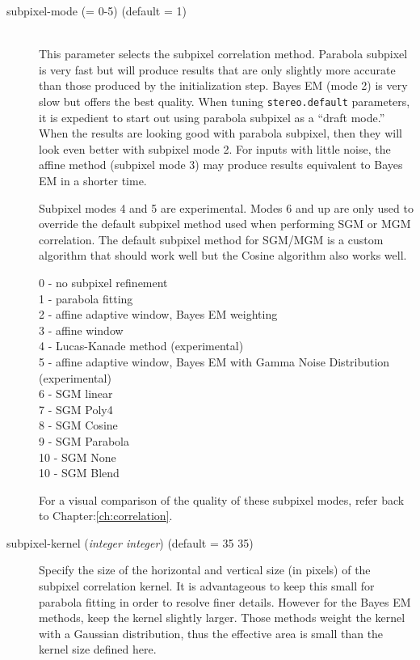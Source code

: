 \begin{description}

\item[subpixel-mode \textnormal{\small{(= 0-5)}} (default = 1)] \hfill \\
  This parameter selects the subpixel correlation method. Parabola subpixel
  is very fast but will produce results that are only slightly more accurate
   than those produced by the initialization step. Bayes EM (mode 2)
  is very slow but offers the best quality. When tuning {\tt stereo.default}
  parameters, it is expedient to start out using parabola subpixel as a
  ``draft mode.'' When the results are looking good with parabola subpixel,
  then they  will look even better with subpixel mode 2.  For inputs with
  little noise, the affine method (subpixel mode 3) may produce results
  equivalent to Bayes EM in a shorter time.
  
  Subpixel modes 4 and 5 are experimental.  Modes 6 and up are only used to
  override the default subpixel method used when performing SGM or MGM 
  correlation.  The default subpixel method for SGM/MGM is a custom 
  algorithm that should work well but the Cosine algorithm also works well.

  \begin{description}
    \item[0 - no subpixel refinement]
    \item[1 - parabola fitting ]
    \item[2 - affine adaptive window, Bayes EM weighting ]
    \item[3 - affine window ]
    \item[4 - Lucas-Kanade method (experimental)]
    \item[5 - affine adaptive window, Bayes EM with Gamma Noise Distribution (experimental) ]
    \item[6 - SGM linear ]
    \item[7 - SGM Poly4 ]
    \item[8 - SGM Cosine ]
    \item[9 - SGM Parabola ]
    \item[10 - SGM None ]
    \item[10 - SGM Blend ]
  \end{description}

  For a visual comparison of the quality of these subpixel modes,
  refer back to Chapter:\ref{ch:correlation}.

\item[subpixel-kernel \textnormal{\small{(\emph{integer integer})}} (default = 35 35)]
  Specify the size of the horizontal and vertical size (in pixels) of
  the subpixel correlation kernel. It is advantageous to keep this
  small for parabola fitting in order to resolve finer
  details. However for the Bayes EM methods, keep the kernel slightly
  larger. Those methods weight the kernel with a Gaussian
  distribution, thus the effective area is small than the kernel size
  defined here.

\end{description}

